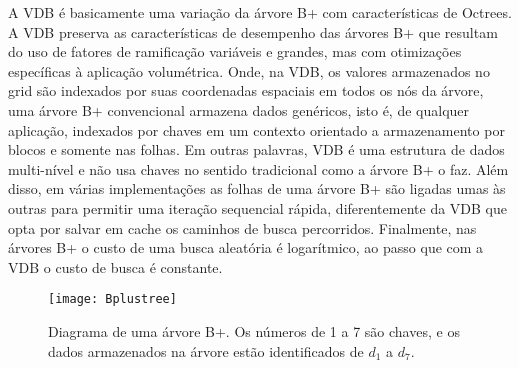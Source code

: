A VDB é basicamente uma variação da árvore B+ com características de Octrees. A VDB preserva as características de desempenho das árvores B+ que resultam do uso de fatores de ramificação variáveis e grandes, mas com otimizações específicas à aplicação volumétrica. Onde, na VDB, os valores armazenados no grid são indexados por suas coordenadas espaciais em todos os nós da árvore, uma árvore B+ convencional armazena dados genéricos, isto é, de qualquer aplicação, indexados por chaves em um contexto orientado a armazenamento por blocos e somente nas folhas. Em outras palavras, VDB é uma estrutura de dados multi-nível e não usa chaves no sentido tradicional como a árvore B+ o faz. Além disso, em várias implementações as folhas de uma árvore B+ são ligadas umas às outras para permitir uma iteração sequencial rápida, diferentemente da VDB que opta por salvar em cache os caminhos de busca percorridos. Finalmente, nas árvores B+ o custo de uma busca aleatória é logarítmico, ao passo que com a VDB o custo de busca é constante. 
 
\begin{figure}[!htb]
\center
\texttt{[image: Bplustree]}
\caption{Diagrama de uma árvore B+. Os números de 1 a 7 são chaves, e os dados armazenados na árvore estão identificados de $d_{1}$ a $d_{7}$.}
\label{bplustree}
\end{figure}

